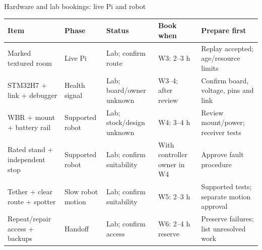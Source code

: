 \begin{frame}{Hardware and lab bookings: live Pi and robot}
\small\linespread{1.03}\selectfont\renewcommand{\arraystretch}{1.05}
\begin{tabular}{@{}L{40mm}L{29mm}L{31mm}L{32mm}L{46mm}@{}}\toprule
\textbf{Item} & \textbf{Phase} & \textbf{Status} & \textbf{Book when} & \textbf{Prepare first}\\\midrule
Marked textured room & Live Pi & Lab; confirm route & W3: 2--3 h & Replay accepted; age/resource limits\\
STM32H7 + link + debugger & Health signal & Lab; board/owner unknown & W3--4; after review & Confirm board, voltage, pins and link\\
WBR + mount + battery rail & Supported robot & Lab; stock/design unknown & W4: 3--4 h & Review mount/power; receiver tests\\
Rated stand + independent stop & Supported robot & Lab; confirm suitability & With controller owner in W4 & Approve fault procedure\\
Tether + clear route + spotter & Slow robot motion & Lab; confirm suitability & W5: 2--3 h & Supported tests; separate motion approval\\
Repeat/repair access + backups & Handoff & Lab; confirm access & W6: 2--4 h reserve & Preserve failures; list unresolved work\\\bottomrule\end{tabular}
\end{frame}

